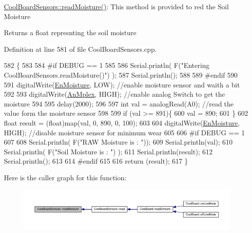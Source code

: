\hyperlink{class_cool_board_sensors_a8761bff50373c485f4465c8db47d0633}{Cool\+Board\+Sensors\+::read\+Moisture()}\+: This method is provided to red the Soil Moisture

\begin{DoxyReturn}{Returns}
a float represnting the soil moisture 
\end{DoxyReturn}


Definition at line 581 of file Cool\+Board\+Sensors.\+cpp.


\begin{DoxyCode}
582 \{
583 
584 \textcolor{preprocessor}{#if DEBUG == 1}
585     
586     Serial.println( F(\textcolor{stringliteral}{"Entering CoolBoardSensors.readMoisture()"}) );
587     Serial.println();
588     
589 \textcolor{preprocessor}{#endif}
590 
591     digitalWrite(\hyperlink{class_cool_board_sensors_a6177d02e14a057a2f171a2e930b5038d}{EnMoisture}, LOW);                 \textcolor{comment}{//enable moisture sensor and waith a bit}
592 
593     digitalWrite(\hyperlink{class_cool_board_sensors_a12ef28b1046219e0aee10bf64e28c4a5}{AnMplex}, HIGH);         \textcolor{comment}{//enable analog Switch to get the moisture}
594 
595     delay(2000);
596 
597     \textcolor{keywordtype}{int} val = analogRead(A0);                       \textcolor{comment}{//read the value form the moisture sensor}
598 
599     \textcolor{keywordflow}{if} (val >= 891)\{
600         val = 890;
601     \}
602     \textcolor{keywordtype}{float} result = (float)map(val, 0, 890, 0, 100); 
603 
604     digitalWrite(\hyperlink{class_cool_board_sensors_a6177d02e14a057a2f171a2e930b5038d}{EnMoisture}, HIGH);                  \textcolor{comment}{//disable moisture sensor for minimum wear}
605     
606 \textcolor{preprocessor}{#if DEBUG == 1 }
607 
608     Serial.println( F(\textcolor{stringliteral}{"RAW Moisture  is : "}));
609     Serial.println(val);
610     Serial.println( F(\textcolor{stringliteral}{"Soil Moisture is : "}) );
611     Serial.println(result);
612     Serial.println();
613 
614 \textcolor{preprocessor}{#endif }
615 
616     \textcolor{keywordflow}{return} (result);
617 \}
\end{DoxyCode}
Here is the caller graph for this function\+:\nopagebreak
\begin{figure}[H]
\begin{center}
\leavevmode
\includegraphics[width=350pt]{de/d46/class_cool_board_sensors_a8761bff50373c485f4465c8db47d0633_icgraph}
\end{center}
\end{figure}
\mbox{\label{class_cool_board_sensors_a6944b6ea7bce8e2fce1b434acfd9d5f3}} 
